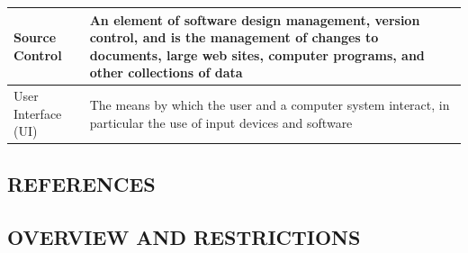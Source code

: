 \documentclass[letterpaper, 10pt, draftclsnofoot, compsoc, onecolumn]{IEEEtran}
\begin{document}
\begin{flushleft}
\begin{supertabular}{|m{1.3587599in}|m{5.00806in}|}
\color{black} Source Control &
\color{black} An element of software design management, version control, and is the management of changes to documents, large web sites, computer programs, and other collections of data\\\hline
{}\color{black} User Interface (UI) &
\color{black} The means by which the user and a computer system interact, in particular the use of input devices and software\\\hline
\end{supertabular}
\end{flushleft}
\subsection[REFERENCES]{\rmfamily\bfseries\color{black}
REFERENCES}


\subsection[OVERVIEW AND
RESTRICTIONS]{\rmfamily\bfseries\color{black}
OVERVIEW AND RESTRICTIONS}



\bigskip

\end{document}
